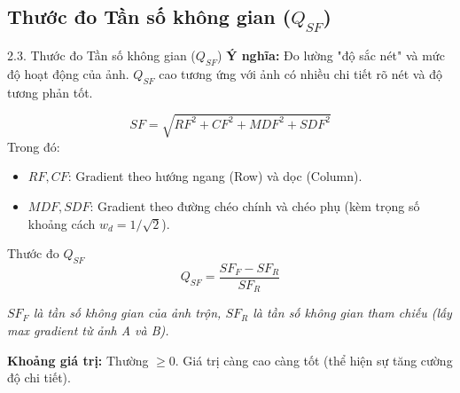 \documentclass{beamer}
\begin{document}
\subsection{Thước đo Tần số không gian ($Q_{SF}$)}
\begin{frame}{2.3. Thước đo Tần số không gian ($Q_{SF}$)}
    \textbf{Ý nghĩa:} Đo lường "độ sắc nét" và mức độ hoạt động của ảnh. $Q_{SF}$ cao tương ứng với ảnh có nhiều chi tiết rõ nét và độ tương phản tốt.

    \begin{equation}
        SF = \sqrt{RF^2 + CF^2 + MDF^2 + SDF^2}
    \end{equation}
    Trong đó:
    \begin{itemize}
        \item $RF, CF$: Gradient theo hướng ngang (Row) và dọc (Column).
        \item $MDF, SDF$: Gradient theo đường chéo chính và chéo phụ (kèm trọng số khoảng cách $w_d = 1/\sqrt{2}$).
    \end{itemize}

    \begin{block}{Thước đo $Q_{SF}$}
    \begin{equation}
        Q_{SF} = \frac{SF_F - SF_R}{SF_R}
    \end{equation}
    \end{block}
    \footnotesize{\textit{$SF_F$ là tần số không gian của ảnh trộn, $SF_R$ là tần số không gian tham chiếu (lấy max gradient từ ảnh A và B).}}

    \vspace{0.3cm}
    \textbf{Khoảng giá trị:} Thường $\ge 0$. Giá trị càng cao càng tốt (thể hiện sự tăng cường độ chi tiết).
\end{frame}
\end{document}
